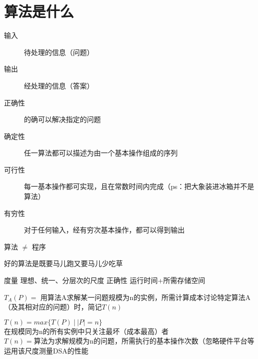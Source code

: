 
\chapter*{算法是什么}
\begin{description}
    \item[输入] 待处理的信息（问题）
    \item[输出] 经处理的信息（答案）
    \item[正确性] 的确可以解决指定的问题
    \item[确定性] 任一算法都可以描述为由一个基本操作组成的序列
    \item[可行性] 每一基本操作都可实现，且在常数时间内完成（ps：把大象装进冰箱并不是算法）
    \item[有穷性] 对于任何输入，经有穷次基本操作，都可以得到输出
\end{description}
算法 $\neq$ 程序

好的算法是既要马儿跑又要马儿少吃草

度量
理想、统一、分层次的尺度
正确性
运行时间+所需存储空间

$T_A(P)=$
用算法A求解某一问题规模为n的实例，所需计算成本讨论特定算法A（及其相对应的问题）时，简记$T(n)$

$T(n)= max\{T(P) \ | \ |P|=n\}$ \\
在规模同为n的所有实例中只关注最坏（成本最高）者 \\
$T(n)=$算法为求解规模为n的问题，所需执行的基本操作次数（忽略硬件平台等运用该尺度测量DSA的性能

